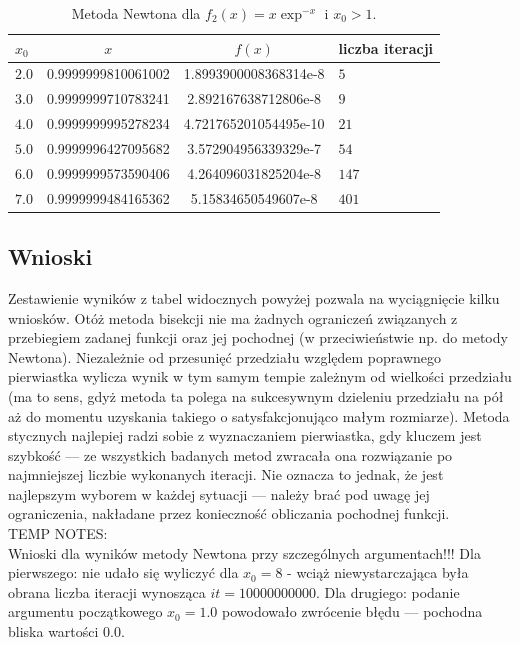 \documentclass{classrep}
\begin{document}
		\begin{table}[!hpbt]
        		\centering
        		\footnotesize
			\begin{tabular}{lSSl} \toprule
				{$x_0$} & {$x$} & {$f(x)$} & {liczba iteracji}\\ \midrule
				$2.0$ & 0.9999999810061002 & 1.8993900008368314e-8 & $5$ \\ 
				$3.0$ & 0.9999999710783241 & 2.892167638712806e-8 & $9$ \\
	 			$4.0$ & 0.9999999995278234 & 4.721765201054495e-10 & $21$ \\
	 			$5.0$ & 0.9999996427095682 & 3.572904956339329e-7 & $54$ \\
	 			$6.0$ & 0.9999999573590406 & 4.264096031825204e-8 & $147$ \\
	 			$7.0$ & 0.9999999484165362 & 5.15834650549607e-8 & $401$ \\  \bottomrule
	 		\end{tabular}
	 		\caption{Metoda Newtona dla $f_2(x)=x\exp^{-x}$ i $x_0>1$.}
			\label{table:6}			
		\end{table}	

	\subsection{Wnioski}
		Zestawienie wyników z tabel widocznych powyżej pozwala na wyciągnięcie kilku wniosków. Otóż metoda bisekcji nie ma żadnych ograniczeń związanych z przebiegiem zadanej funkcji oraz jej pochodnej (w przeciwieństwie np. do metody Newtona). Niezależnie od przesunięć przedziału względem poprawnego pierwiastka wylicza wynik w tym samym tempie zależnym od wielkości przedziału (ma to sens, gdyż metoda ta polega na sukcesywnym dzieleniu przedziału na pół aż do momentu uzyskania takiego o satysfakcjonująco małym rozmiarze). Metoda stycznych najlepiej radzi sobie z wyznaczaniem pierwiastka, gdy kluczem jest szybkość --- ze wszystkich badanych metod zwracała ona rozwiązanie po najmniejszej liczbie wykonanych iteracji. Nie oznacza to jednak, że jest najlepszym wyborem w każdej sytuacji --- należy brać pod uwagę jej ograniczenia, nakładane przez konieczność obliczania pochodnej funkcji.  \\
	
		TEMP NOTES:	 \\
		Wnioski dla wyników metody Newtona przy szczególnych argumentach!!!		
		Dla pierwszego: nie udało się wyliczyć dla $x_0=8$ - wciąż niewystarczająca była obrana liczba iteracji wynosząca $it=10000000000$.
		Dla drugiego: podanie argumentu początkowego $x_0=1.0$ powodowało zwrócenie błędu --- pochodna bliska wartości $0.0$.
		
\end{document}
